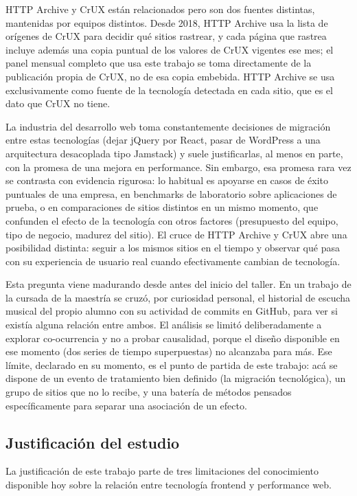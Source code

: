 \documentclass[12pt, a4paper]{article}
\begin{document}
HTTP Archive y CrUX están relacionados pero son dos fuentes distintas, mantenidas por equipos distintos. Desde 2018, HTTP Archive usa la lista de orígenes de CrUX para decidir qué sitios rastrear, y cada página que rastrea incluye además una copia puntual de los valores de CrUX vigentes ese mes; el panel mensual completo que usa este trabajo se toma directamente de la publicación propia de CrUX, no de esa copia embebida. HTTP Archive se usa exclusivamente como fuente de la tecnología detectada en cada sitio, que es el dato que CrUX no tiene.

La industria del desarrollo web toma constantemente decisiones de migración entre estas tecnologías (dejar jQuery por React, pasar de WordPress a una arquitectura desacoplada tipo Jamstack) y suele justificarlas, al menos en parte, con la promesa de una mejora en performance. Sin embargo, esa promesa rara vez se contrasta con evidencia rigurosa: lo habitual es apoyarse en casos de éxito puntuales de una empresa, en benchmarks de laboratorio sobre aplicaciones de prueba, o en comparaciones de sitios distintos en un mismo momento, que confunden el efecto de la tecnología con otros factores (presupuesto del equipo, tipo de negocio, madurez del sitio). El cruce de HTTP Archive y CrUX abre una posibilidad distinta: seguir a los mismos sitios en el tiempo y observar qué pasa con su experiencia de usuario real cuando efectivamente cambian de tecnología.

Esta pregunta viene madurando desde antes del inicio del taller. En un trabajo de la cursada de la maestría se cruzó, por curiosidad personal, el historial de escucha musical del propio alumno con su actividad de commits en GitHub, para ver si existía alguna relación entre ambos. El análisis se limitó deliberadamente a explorar co-ocurrencia y no a probar causalidad, porque el diseño disponible en ese momento (dos series de tiempo superpuestas) no alcanzaba para más. Ese límite, declarado en su momento, es el punto de partida de este trabajo: acá se dispone de un evento de tratamiento bien definido (la migración tecnológica), un grupo de sitios que no lo recibe, y una batería de métodos pensados específicamente para separar una asociación de un efecto.

\subsection{Justificación del estudio}

La justificación de este trabajo parte de tres limitaciones del conocimiento disponible hoy sobre la relación entre tecnología frontend y performance web.
\end{document}
